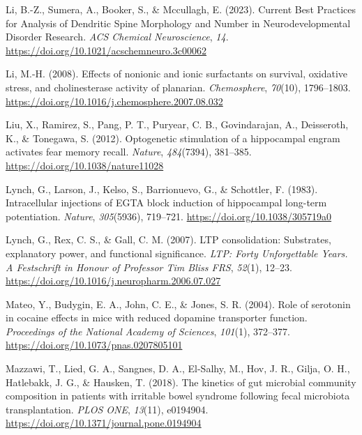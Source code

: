\documentclass[
  jou,
  floatsintext,
  longtable,
  nolmodern,
  notxfonts,
  notimes,
  donotrepeattitle,
  colorlinks=true,linkcolor=blue,citecolor=blue,urlcolor=blue]{apa7}
\newlength{\cslhangindent}
\newenvironment{CSLReferences}[2] %
 {\begin{list}{}{%
  \setlength{\itemindent}{0pt}
  \setlength{\leftmargin}{0pt}
  \setlength{\parsep}{0pt}
  \ifodd #1
   \setlength{\leftmargin}{\cslhangindent}
   \setlength{\itemindent}{-1\cslhangindent}
  \fi
  \setlength{\itemsep}{#2\baselineskip}}}
 {\end{list}}
\begin{document}
\begin{CSLReferences}{1}{0}
Li, B.-Z., Sumera, A., Booker, S., \& Mccullagh, E. (2023). Current
{Best} {Practices} for {Analysis} of {Dendritic} {Spine} {Morphology}
and {Number} in {Neurodevelopmental} {Disorder} {Research}. \emph{ACS
Chemical Neuroscience}, \emph{14}.
\url{https://doi.org/10.1021/acschemneuro.3c00062}

Li, M.-H. (2008). Effects of nonionic and ionic surfactants on survival,
oxidative stress, and cholinesterase activity of planarian.
\emph{Chemosphere}, \emph{70}(10), 1796--1803.
\url{https://doi.org/10.1016/j.chemosphere.2007.08.032}

Liu, X., Ramirez, S., Pang, P. T., Puryear, C. B., Govindarajan, A.,
Deisseroth, K., \& Tonegawa, S. (2012). Optogenetic stimulation of a
hippocampal engram activates fear memory recall. \emph{Nature},
\emph{484}(7394), 381--385. \url{https://doi.org/10.1038/nature11028}

Lynch, G., Larson, J., Kelso, S., Barrionuevo, G., \& Schottler, F.
(1983). Intracellular injections of {EGTA} block induction of
hippocampal long-term potentiation. \emph{Nature}, \emph{305}(5936),
719--721. \url{https://doi.org/10.1038/305719a0}

Lynch, G., Rex, C. S., \& Gall, C. M. (2007). {LTP} consolidation:
{Substrates}, explanatory power, and functional significance. \emph{LTP:
Forty Unforgettable Years. A Festschrift in Honour of Professor Tim
Bliss FRS}, \emph{52}(1), 12--23.
\url{https://doi.org/10.1016/j.neuropharm.2006.07.027}

Mateo, Y., Budygin, E. A., John, C. E., \& Jones, S. R. (2004). Role of
serotonin in cocaine effects in mice with reduced dopamine transporter
function. \emph{Proceedings of the National Academy of Sciences},
\emph{101}(1), 372--377. \url{https://doi.org/10.1073/pnas.0207805101}

Mazzawi, T., Lied, G. A., Sangnes, D. A., El-Salhy, M., Hov, J. R.,
Gilja, O. H., Hatlebakk, J. G., \& Hausken, T. (2018). The kinetics of
gut microbial community composition in patients with irritable bowel
syndrome following fecal microbiota transplantation. \emph{PLOS ONE},
\emph{13}(11), e0194904.
\url{https://doi.org/10.1371/journal.pone.0194904}


\end{CSLReferences}
\end{document}
